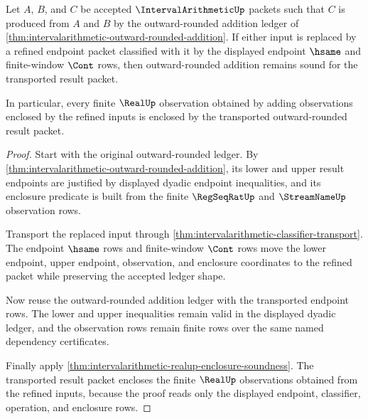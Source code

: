 \begin{theorem}
\label{thm:intervalarithmetic-refined-endpoint-addition-soundness}
Let $A$, $B$, and $C$ be accepted $\IntervalArithmeticUp$ packets such that
$C$ is produced from $A$ and $B$ by the outward-rounded addition ledger of
\autoref{thm:intervalarithmetic-outward-rounded-addition}. If either input is
replaced by a refined endpoint packet classified with it by the displayed
endpoint $\hsame$ and finite-window $\Cont$ rows, then outward-rounded
addition remains sound for the transported result packet.

In particular, every finite $\RealUp$ observation obtained by adding
observations enclosed by the refined inputs is enclosed by the transported
outward-rounded result packet.
\end{theorem}
\begin{proof}
Start with the original outward-rounded ledger. By
\autoref{thm:intervalarithmetic-outward-rounded-addition}, its lower and
upper result endpoints are justified by displayed dyadic endpoint
inequalities, and its enclosure predicate is built from the finite
$\RegSeqRatUp$ and $\StreamNameUp$ observation rows.

Transport the replaced input through
\autoref{thm:intervalarithmetic-classifier-transport}. The endpoint
$\hsame$ rows and finite-window $\Cont$ rows move the lower endpoint, upper
endpoint, observation, and enclosure coordinates to the refined packet while
preserving the accepted ledger shape.

Now reuse the outward-rounded addition ledger with the transported endpoint
rows. The lower and upper inequalities remain valid in the displayed dyadic
ledger, and the observation rows remain finite rows over the same named
dependency certificates.

Finally apply
\autoref{thm:intervalarithmetic-realup-enclosure-soundness}. The transported
result packet encloses the finite $\RealUp$ observations obtained from the
refined inputs, because the proof reads only the displayed endpoint,
classifier, operation, and enclosure rows.
\end{proof}

